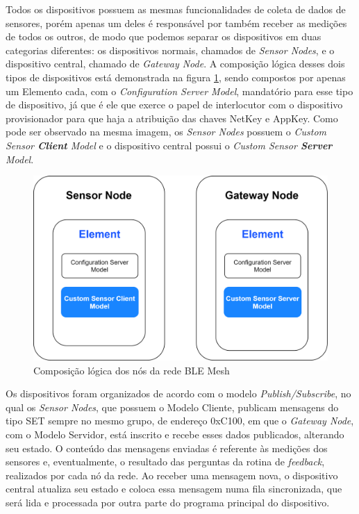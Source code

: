 \documentclass[../monografia.tex]{subfiles}
\begin{document}
Todos os dispositivos possuem as mesmas funcionalidades de coleta de dados de sensores, porém apenas um deles é responsável por também receber as medições de todos os outros, de modo que podemos separar os dispositivos em duas categorias diferentes: os dispositivos normais, chamados de \textit{Sensor Nodes}, e o dispositivo central, chamado de \textit{Gateway Node}. A composição lógica desses dois tipos de dispositivos está demonstrada na figura \ref{fig:mesh-node-architecture}, sendo compostos por apenas um Elemento cada, com o \textit{Configuration Server Model}, mandatório para esse tipo de dispositivo, já que é ele que exerce o papel de interlocutor com o dispositivo provisionador para que haja a atribuição das chaves NetKey e AppKey. Como pode ser observado na mesma imagem, os \textit{Sensor Nodes} possuem o \textit{Custom Sensor \textbf{Client} Model} e o dispositivo central possui o \textit{Custom Sensor \textbf{Server} Model}.

\begin{figure}[h!]
	\centering
	\includegraphics[scale=0.22]{mesh-node-architecture.png}
	\caption{Composição lógica dos nós da rede BLE Mesh}
	\label{fig:mesh-node-architecture}
\end{figure}

Os dispositivos foram organizados de acordo com o modelo \textit{Publish/Subscribe}, no qual os \textit{Sensor Nodes}, que possuem o Modelo Cliente, publicam mensagens do tipo SET sempre no mesmo grupo, de endereço 0xC100, em que o \textit{Gateway Node}, com o Modelo Servidor, está inscrito e recebe esses dados publicados, alterando seu estado. O conteúdo das mensagens enviadas é referente às medições dos sensores e, eventualmente, o resultado das perguntas da rotina de \textit{feedback}, realizados por cada nó da rede. Ao receber uma mensagem nova, o dispositivo central atualiza seu estado e coloca essa mensagem numa fila sincronizada, que será lida e processada por outra parte do programa principal do dispositivo. 
\end{document}
